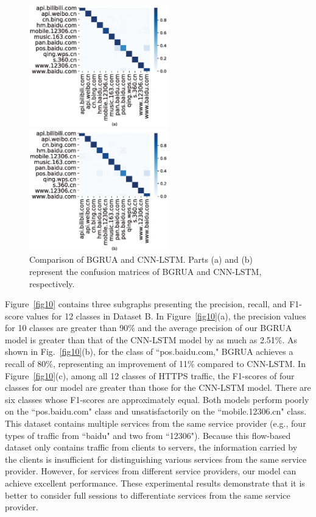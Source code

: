 \documentclass[preprint,12pt]{elsarticle}
\begin{document}
\begin{figure}[htbp]
\centering
\begin{minipage}[t]{0.48\textwidth}
\centering
\includegraphics[width=6cm]{heatmap-bgrua.eps}
\end{minipage}
\begin{minipage}[t]{0.48\textwidth}
\centering
\includegraphics[width=6cm]{heatmap-cnn.eps}
\end{minipage}
\caption{Comparison of BGRUA and CNN-LSTM. Parts (a) and (b) represent the confusion matrices of BGRUA and CNN-LSTM, respectively.}\label{fig9} 
\end{figure}



Figure~\ref{fig10} contains three subgraphs presenting the precision, recall, and F1-score values for 12 classes in Dataset B. In Figure~\ref{fig10}(a), the precision values for 10 classes are greater than 90\% and the average precision of our BGRUA model is greater than that of the CNN-LSTM model by as much as 2.51\%. As shown in Fig.~\ref{fig10}(b), for the class of ``pos.baidu.com," BGRUA achieves a recall of 80\%, representing an improvement of 11\% compared to CNN-LSTM. In Figure~\ref{fig10}(c), among all 12 classes of HTTPS traffic, the F1-scores of four classes for our model are greater than those for the CNN-LSTM model. There are six classes whose F1-scores are approximately equal. Both models perform poorly on the ``pos.baidu.com" class and unsatisfactorily on the ``mobile.12306.cn" class. This dataset contains multiple services from the same service provider (e.g., four types of traffic from ``baidu" and two from ``12306"). Because this flow-based dataset only contains traffic from clients to servers, the information carried by the clients is insufficient for distinguishing various services from the same service provider. However, for services from different service providers, our model can achieve excellent performance. These experimental results demonstrate that it is better to consider full sessions to differentiate services from the same service provider.
\end{document}
